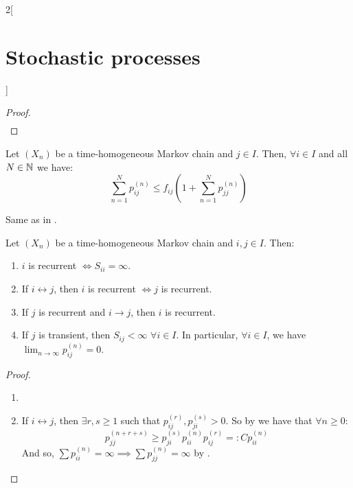 \documentclass[../../../main_math.tex]{subfiles}
\begin{document}
\begin{multicols}{2}[\section{Stochastic processes}]
\begin{proof}
\begin{multline*}
    \end{multline*}
  \end{proof}
  \begin{lemma}\label{SP:lemaPrerec2}
    Let $(X_n)$ be a time-homogeneous Markov chain and $j\in I$. Then, $\forall i\in I$ and all $N\in\mathbb{N}$ we have:
    $$
      \sum_{n=1}^Np_{ij}^{(n)}\leq f_{ij}\left(1+\sum_{n=1}^Np_{jj}^{(n)}\right)
    $$
  \end{lemma}
  \begin{sproof}
    Same as in .
  \end{sproof}
  \begin{theorem}\label{SP:thmRec}
    Let $(X_n)$ be a time-homogeneous Markov chain and $i,j\in I$. Then:
    \begin{enumerate}
      \item\label{SP:thmRecA} $i$ is recurrent $\iff S_{ii}=\infty$.
      \item\label{SP:thmRecB} If $i\leftrightarrow j$, then $i$ is recurrent $\iff j$ is recurrent.
      \item\label{SP:thmRecC} If $j$ is recurrent and $i\to j$, then $i$ is recurrent.
      \item\label{SP:thmRecD} If $j$ is transient, then $S_{ij}<\infty$ $\forall i\in I$. In particular, $\forall i\in I$, we have $\displaystyle \lim_{n\to\infty}p_{ij}^{(n)}=0$.
    \end{enumerate}
  \end{theorem}
  \begin{proof}
    \begin{enumerate}
      \item {}
      \item If $i\leftrightarrow j$, then $\exists r,s\geq 1$ such that $p_{ij}^{(r)}, p_{ji}^{(s)}>0$. So by  we have that $\forall n\geq 0$:
            $$
              p_{jj}^{(n+r+s)} \geq p_{ji}^{(s)}p_{ii}^{(n)}p_{ij}^{(r)}=:C p_{ii}^{(n)}
            $$
            And so, $\sum p_{ii}^{(n)}=\infty\implies \sum p_{jj}^{(n)} = \infty$ by .

\end{enumerate}
\end{proof}
\end{multicols}
\end{document}
